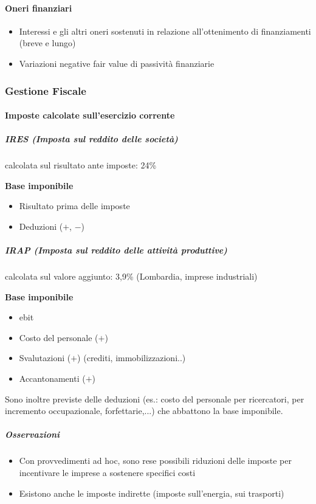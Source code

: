 \documentclass[10pt,a4paper,fleqn,oneside]{book}
\begin{document}
\paragraph{Oneri finanziari}
\begin{itemize}
    \item Interessi e gli altri oneri sostenuti in relazione all’ottenimento di
    finanziamenti (breve e lungo)
    \item Variazioni negative fair value di passività finanziarie
\end{itemize}

\subsubsection{Gestione Fiscale}
\paragraph{Imposte calcolate sull’esercizio corrente}

\subparagraph{IRES (Imposta sul reddito delle società)}
calcolata sul risultato ante imposte: 24\%

\textbf{Base imponibile}
\begin{itemize}
    \item Risultato prima delle imposte 
    \item Deduzioni ($+$, $-$)
\end{itemize}

\subparagraph{IRAP (Imposta sul reddito delle attività produttive)}
calcolata sul valore aggiunto: 3,9\% (Lombardia, imprese industriali)

\textbf{Base imponibile}
\begin{itemize}
    \item \gls{ebit} 
    \item Costo del personale ($+$)
    \item Svalutazioni ($+$) (crediti, immobilizzazioni..) 
    \item Accantonamenti ($+$)
\end{itemize}

Sono inoltre previste delle deduzioni (es.: costo del personale per
ricercatori, per incremento occupazionale, forfettarie,...) che abbattono la
base imponibile.

\subparagraph{Osservazioni}
\begin{itemize}
    \item Con provvedimenti ad hoc, sono rese possibili riduzioni delle imposte
    per incentivare le imprese a sostenere specifici costi
    \item Esistono anche le imposte indirette (imposte sull’energia, sui trasporti)
\end{itemize}
\end{document}
